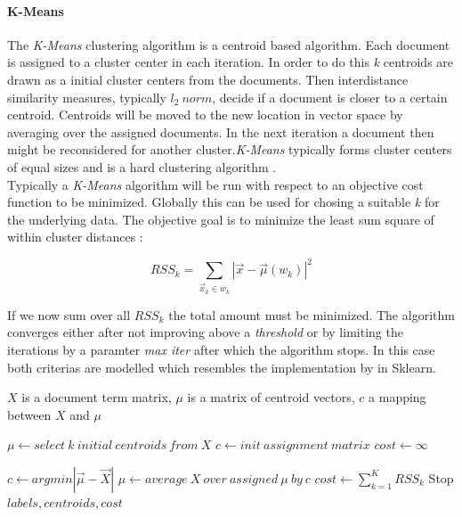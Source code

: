     \paragraph{K-Means}
    The \emph{K-Means} clustering algorithm is a centroid based algorithm. Each document is assigned to a cluster center in each iteration. In order to do this \emph{k} centroids are drawn as a initial cluster centers from the documents. Then interdistance similarity measures, typically $l_2\:norm$, decide if a document is closer to a certain centroid. Centroids will be moved to the new location in vector space by averaging over the assigned documents. In the next iteration a document then might be reconsidered for another cluster.\emph{K-Means} typically forms cluster centers of equal sizes and is a hard clustering algorithm \cite{IRBookStanford2008}.\\
    Typically a \emph{K-Means} algorithm will be run with respect to an objective cost function to be minimized. Globally this can be used for chosing a suitable \emph{k} for the underlying data. The objective goal is to minimize the least sum square of within cluster distances \cite{IRBookStanford2008}:

      \begin{equation}
        RSS_k = \sum_{\vec{x}_k \in \textit{w}_k}|\vec{x} - \vec{\mu}(\textit{w}_k)|^{2}
      \end{equation}

    If we now sum over all $RSS_k$ the total amount must be minimized. The algorithm converges either after not improving above a \emph{threshold} or by limiting the iterations by a paramter \emph{max iter} after which the algorithm stops. In this case both criterias are modelled which resembles the implementation by \cite{ScikitLearn} in Sklearn.

    \begin{algorithm}[H]
    \begin{algorithmic}[1]
      \caption{$X$ is a document term matrix, $\mu$ is a matrix of centroid vectors, $c$ a mapping between $X$ and $\mu$}\label{kmeans}
        \State $\mu \gets select\:k\:initial\:centroids\:from\:X$
        \State $c \gets init\:assignment\:matrix {}$
        \State $cost \gets \infty$

          \State $c \gets argmin|\vec{\mu} - \vec{X}|$ 
          \State $\mu \gets average\:X\:over\:assigned\:\mu\:by\:c$
          \State $cost \gets \sum_{k = 1}^{K}RSS_k$
            \State Stop
          \EndIf
        \EndFor
        \State \Return $labels, centroids, cost$
      \EndFunction
    \end{algorithmic}
    \end{algorithm}

